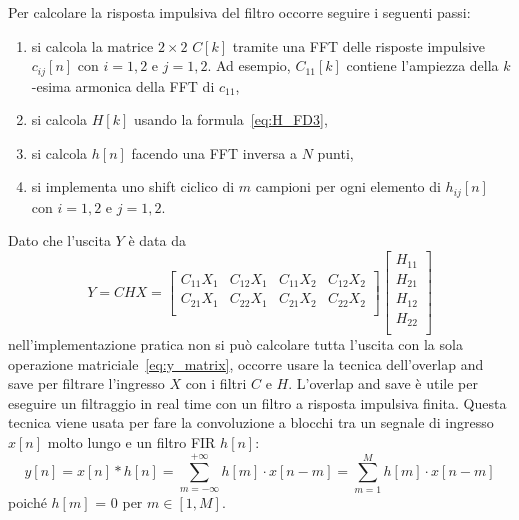 \documentclass[12pt,a4paper,titlepage]{article}
\begin{document}
Per calcolare la risposta impulsiva del filtro occorre seguire i seguenti passi:
\begin{enumerate}
\item si calcola la matrice $2 \times 2$ $C[k]$ tramite una FFT delle risposte impulsive $c_{ij}[n]$ con $i = 1, 2$ e $j = 1, 2$. Ad esempio, $C_{11}[k]$ contiene l'ampiezza della $k$-esima armonica della FFT di $c_{11}$,
\item si calcola $H[k]$ usando la formula~\eqref{eq:H_FD3},
\item si calcola $h[n]$ facendo una FFT inversa a $N$ punti,
\item si implementa uno shift ciclico di $m$ campioni per ogni elemento di $h_{ij}[n]$ con $i = 1, 2$ e $j = 1, 2$.
\end{enumerate}

Dato che l'uscita $Y$ è data da
\begin{equation}\label{eq:y_matrix}
Y = CHX = 
\begin{bmatrix}
C_{11} X_1 & C_{12} X_1 & C_{11} X_2 & C_{12} X_2 \\ 
C_{21} X_1 & C_{22} X_1 & C_{21} X_2 & C_{22} X_2 \\ 
\end{bmatrix}
\begin{bmatrix}
H_{11}\\
H_{21}\\
H_{12}\\
H_{22}\\
\end{bmatrix}
\end{equation}
nell'implementazione pratica non si può calcolare tutta l'uscita con la sola operazione matriciale~\eqref{eq:y_matrix}, occorre usare la tecnica dell'overlap and save per filtrare l'ingresso $X$ con i filtri $C$ e $H$. L'overlap and save è utile per eseguire un filtraggio in real time con un filtro a risposta impulsiva finita. Questa tecnica viene usata per fare la convoluzione a blocchi tra un segnale di ingresso $x[n]$ molto lungo e un filtro FIR $h[n]$:
\begin{equation}
y[n] = x[n] * h[n] = \sum_{m=-\infty}^{+\infty} {h[m] \cdot x[n-m]} = \sum_{m=1}^{M} {h[m] \cdot x[n-m]}
\end{equation}
poiché $h[m]$ = 0 per $m \in [1, M]$.
\end{document}
